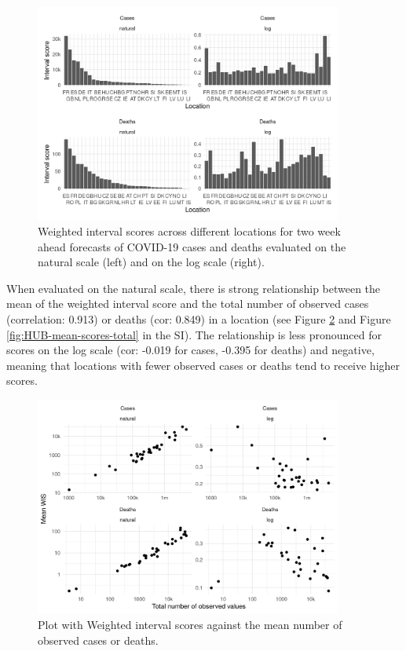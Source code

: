 \documentclass{article}
\begin{document}
\begin{figure}[h!]
    \centering
    \includegraphics[width=0.9\textwidth]{output/figures/HUB-scores-locations.png}
    \caption{Weighted interval scores across different locations for two week ahead forecasts of COVID-19 cases and deaths evaluated on the natural scale (left) and on the log scale (right). }
    \label{fig:HUB-scores-location}
\end{figure}

When evaluated on the natural scale, there is  strong relationship between the mean of the weighted interval score and the total number of observed cases (correlation: 0.913) or deaths (cor: 0.849) in a location (see Figure \ref{fig:HUB-mean-scores-total-loglog} and Figure \ref{fig:HUB-mean-scores-total} in the SI). The relationship is less pronounced for scores on the log scale (cor: -0.019 for cases, -0.395 for deaths) and negative, meaning that locations with fewer observed cases or deaths tend to receive higher scores. 

\begin{figure}[h!]
    \centering
    \includegraphics[width=0.9\textwidth]{output/figures/HUB-mean-scores-vs-total-log-log.png}
    \caption{Plot with Weighted interval scores against the mean number of observed cases or deaths.}
    \label{fig:HUB-mean-scores-total-loglog}
\end{figure}
\end{document}
